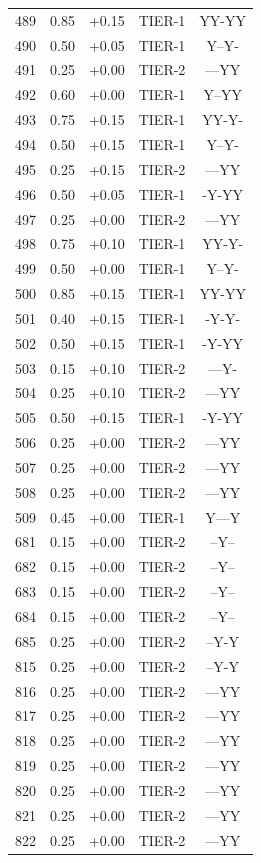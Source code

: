 \begin{longtable}{rlclc}
489 & 0.85 & +0.15 & TIER-1 & YY-YY\\
490 & 0.50 & +0.05 & TIER-1 & Y--Y-\\
491 & 0.25 & +0.00 & TIER-2 & ---YY\\
492 & 0.60 & +0.00 & TIER-1 & Y--YY\\
493 & 0.75 & +0.15 & TIER-1 & YY-Y-\\
494 & 0.50 & +0.15 & TIER-1 & Y--Y-\\
495 & 0.25 & +0.15 & TIER-2 & ---YY\\
496 & 0.50 & +0.05 & TIER-1 & -Y-YY\\
497 & 0.25 & +0.00 & TIER-2 & ---YY\\
498 & 0.75 & +0.10 & TIER-1 & YY-Y-\\
499 & 0.50 & +0.00 & TIER-1 & Y--Y-\\
500 & 0.85 & +0.15 & TIER-1 & YY-YY\\
501 & 0.40 & +0.15 & TIER-1 & -Y-Y-\\
502 & 0.50 & +0.15 & TIER-1 & -Y-YY\\
503 & 0.15 & +0.10 & TIER-2 & ---Y-\\
504 & 0.25 & +0.10 & TIER-2 & ---YY\\
505 & 0.50 & +0.15 & TIER-1 & -Y-YY\\
506 & 0.25 & +0.00 & TIER-2 & ---YY\\
507 & 0.25 & +0.00 & TIER-2 & ---YY\\
508 & 0.25 & +0.00 & TIER-2 & ---YY\\
509 & 0.45 & +0.00 & TIER-1 & Y---Y\\
681 & 0.15 & +0.00 & TIER-2 & --Y--\\
682 & 0.15 & +0.00 & TIER-2 & --Y--\\
683 & 0.15 & +0.00 & TIER-2 & --Y--\\
684 & 0.15 & +0.00 & TIER-2 & --Y--\\
685 & 0.25 & +0.00 & TIER-2 & --Y-Y\\
815 & 0.25 & +0.00 & TIER-2 & --Y-Y\\
816 & 0.25 & +0.00 & TIER-2 & ---YY\\
817 & 0.25 & +0.00 & TIER-2 & ---YY\\
818 & 0.25 & +0.00 & TIER-2 & ---YY\\
819 & 0.25 & +0.00 & TIER-2 & ---YY\\
820 & 0.25 & +0.00 & TIER-2 & ---YY\\
821 & 0.25 & +0.00 & TIER-2 & ---YY\\
822 & 0.25 & +0.00 & TIER-2 & ---YY\\

\end{longtable}
